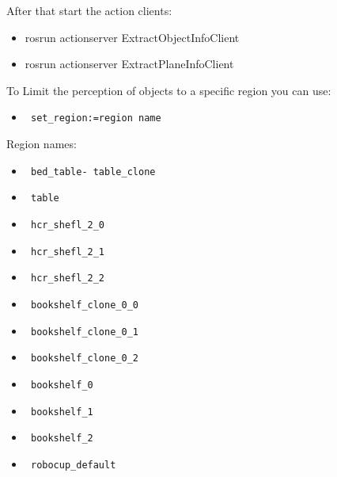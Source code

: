\documentclass[main.tex]{subfiles}
\begin{document}
After that start the action clients:
\begin{itemize}
\item rosrun actionserver ExtractObjectInfoClient
\item rosrun actionserver ExtractPlaneInfoClient
\end{itemize}

To Limit the perception of objects to a specific region you can use:
\begin{itemize}
\item \begin{verbatim} set_region:=region name \end{verbatim} 
\end{itemize}
Region names:
\begin{itemize}
\item \begin{verbatim} bed_table- table_clone \end{verbatim} 
\item \begin{verbatim} table \end{verbatim} 
\item \begin{verbatim} hcr_shefl_2_0 \end{verbatim} 
\item \begin{verbatim} hcr_shefl_2_1 \end{verbatim}
\item \begin{verbatim} hcr_shefl_2_2 \end{verbatim}
\item \begin{verbatim} bookshelf_clone_0_0 \end{verbatim} 
\item \begin{verbatim} bookshelf_clone_0_1 \end{verbatim} 
\item \begin{verbatim} bookshelf_clone_0_2 \end{verbatim} 
\item \begin{verbatim} bookshelf_0 \end{verbatim} 
\item \begin{verbatim} bookshelf_1 \end{verbatim} 
\item \begin{verbatim} bookshelf_2 \end{verbatim} 
\item \begin{verbatim} robocup_default \end{verbatim} 
\end{itemize}
\end{document}
